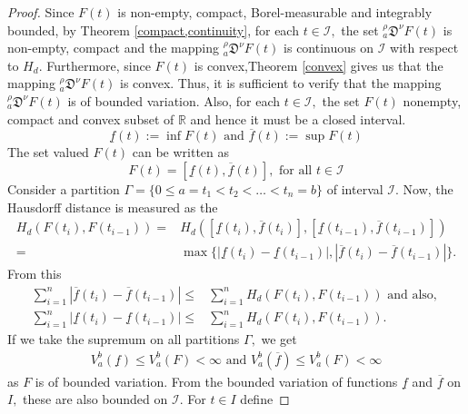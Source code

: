 \documentclass[10pt,a4paper]{amsart}
\begin{document}
 \begin{proof}
     Since $F(t)$ is non-empty, compact, Borel-measurable and integrably bounded, by Theorem \ref{compact,continuity}, for each $t\in \mathcal{I},$ the set $_a^\rho\mathfrak{D}^\nu F(t)$ is non-empty, compact and the mapping $_a^\rho\mathfrak{D}^\nu F(t)$ is continuous on $\mathcal{I}$ with respect to $H_d.$ Furthermore, since $F(t)$ is convex,Theorem \ref{convex} gives us that the mapping $_a^\rho\mathfrak{D}^\nu F(t)$ is convex. Thus, it is sufficient to verify that the mapping $_a^\rho\mathfrak{D}^\nu F(t)$ is of bounded variation. Also, for each $t\in \mathcal{I},$ the set $ F(t)$ nonempty, compact and convex subset of $\mathbb{R}$ and hence it must be a closed interval. 
     \[ \underline{f}(t):= \inf F(t)  \text{ and } \overline{f}(t):=\sup F(t) \]
    The set valued $F(t)$ can be written as 
    \[ F(t)= [\underline{f}(t),\overline{f}(t)], \text{ for all } t\in \mathcal{I} \] 
  Consider a partition $\Gamma=\{0\le a=t_1 <t_2 <\ldots < t_n=b \}$ of interval $\mathcal{I}.$ Now, the Hausdorff distance is measured as the 
  \begin{equation*}
      \begin{aligned}
  H_d(F(t_i),F(t_{i-1}))=& H_d([\underline{f}(t_i),\overline{f}(t_i)],[\underline{f}(t_{i-1}),\overline{f}(t_{i-1})])\\
  =&\max \big\{ |\underline{f}(t_i)-\underline{f}(t_{i-1})|, |\overline{f}(t_{i})-\overline{f}(t_{i-1})|\big\}.
   \end{aligned}
  \end{equation*}
  From this 
   \begin{equation*}
       \begin{aligned}
           \sum_{i=1}^{n}|\overline{f}(t_{i})-\overline{f}(t_{i-1})|\le& \sum_{i=1}^nH_d(F(t_i),F(t_{i-1}))  \text{ and also, } \\
           \sum_{i=1}^{n}|\underline{f}(t_i)-\underline{f}(t_{i-1})|\le& \sum_{i=1}^nH_d(F(t_i),F(t_{i-1})).
       \end{aligned}
   \end{equation*}
  If we take the supremum on all partitions $\Gamma,$ we get
  \begin{equation*}
      \begin{aligned}
          V_a^b(\underline{f})\le V_a^b(F)< \infty  \text{ and }  V_a^b(\overline{f})\le V_a^b(F) < \infty
      \end{aligned}
  \end{equation*}
as $F$ is of bounded variation. From the bounded variation of functions $\underline{f}$ and $ \overline{f}$ on $I,$ these are also bounded on $\mathcal{I}.$ For $t\in I$ define 

\end{proof}
\end{document}
